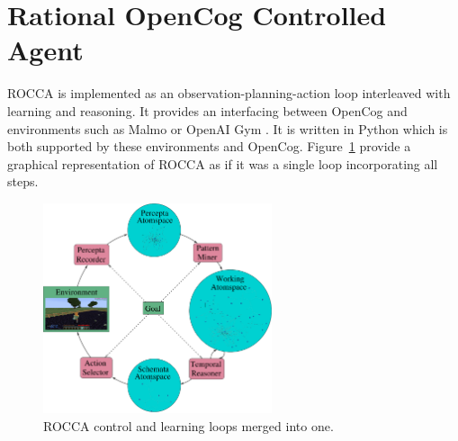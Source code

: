 \documentclass[runningheads]{llncs}
\begin{document}
\section{Rational OpenCog Controlled Agent}
\label{sec:rocca}
ROCCA is implemented as an observation-planning-action loop
interleaved with learning and reasoning.  It provides an interfacing
between OpenCog and environments such as Malmo \cite{Johnson2016} or
OpenAI Gym \cite{Brockman2016}.  It is written in Python which is both
supported by these environments and OpenCog.  Figure~\ref{fig:rocca}
provide a graphical representation of ROCCA as if it was a single loop
incorporating all steps.
\begin{figure}
  \centering
  \includegraphics[width=0.6\textwidth]{pictures/rocca-chart-v0.7.pdf}
  \caption{ROCCA control and learning loops merged into one.}
  \label{fig:rocca}
\end{figure}
\end{document}
